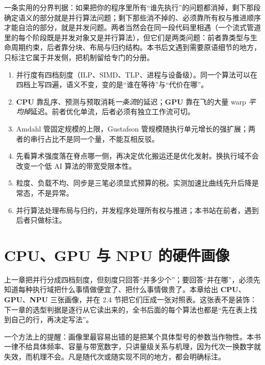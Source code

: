 \documentclass[12pt,a4paper,fontset=fandol]{ctexbook}
\newcommand{\Dom}[1]{\textsf{\bfseries #1}}
\newcommand{\CPU}{\Dom{CPU}}
\newcommand{\GPU}{\Dom{GPU}}
\newcommand{\NPU}{\Dom{NPU}}
\begin{document}
一条实用的分界判据：如果把你的程序里所有``谁先执行''的问题都消掉，剩下那段确定语义的部分就是并行算法问题；剩下那些消不掉的、必须靠所有权与推进顺序才能自洽的部分，就是并发问题。两者当然会在同一段代码里相遇（一个流式管道里的每个阶段既是并发对象又是并行算法），但它们是两类问题：前者靠类型与生命周期约束，后者靠分块、布局与归约结构。本书后文遇到需要原语细节的地方，只标注它属于并发侧，把机制留给专门的分册。

\begin{guideline}[title={本章要点}]
\begin{enumerate}
\item 并行度有四档刻度（ILP、SIMD、TLP、进程与设备级）。同一个算法可以在四档上写四遍，语义不变，变的是``谁在等待''与``代价在哪''。
\item \CPU{} 靠乱序、预测与预取消耗\emph{一条流}的延迟；\GPU{} 靠在飞的大量 warp \emph{平均掉}延迟。前者优化单流，后者必须有独立工作流可切。
\item Amdahl 管固定规模的上限，Gustafson 管规模随执行单元增长的强扩展；两者的串行占比不是同一个量，不能互相反驳。
\item 先看算术强度落在脊点哪一侧，再决定优化搬运还是优化发射。换执行域不会改变一个低 $\mathrm{AI}$ 算法的带宽受限本性。
\item 粒度、负载不均、同步是三笔必须显式预算的税。实测加速比曲线先升后降是常态，不是异常。
\item 并行算法处理布局与归约，并发程序处理所有权与推进；本书站在前者，遇到后者只做标注。
\end{enumerate}
\end{guideline}

\chapter{CPU、GPU 与 NPU 的硬件画像}

上一章把并行分成四档刻度，但刻度只回答``并多少个''；要回答``并在哪''，必须先知道每种执行域把什么事情做便宜了、把什么事情做贵了。本章给出 \CPU、\GPU、\NPU{} 三张画像，并在 2.4 节把它们压成一张对照表。这张表不是装饰：下一章的选型判据是逐行从它读出来的，全书后面的每个算法也都是``先在表上找到自己的行，再决定写法''。

一个方法上的提醒：画像里最容易出错的是把某个具体型号的参数当作物性。本书一律不给具体频率、容量与带宽数字，只讲量级关系与机理，因为代次一换数字就失效，而机理不会。凡是随代次或随实现不同的地方，都会明确标注。
\end{document}
